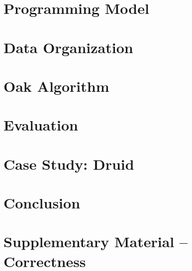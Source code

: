\documentclass[sigplan,10pt,review,anonymous]{acmart}
\theoremstyle{definition}
\begin{document}
    \section{Programming Model}
    
		
   \section{Data Organization}
   \label{sec:arch}
    
		
    \section{Oak Algorithm}
    \label{sec:alg}
    
      
    \section{Evaluation}
    

   \section{Case Study: Druid}
   

    \section{Conclusion}
    
    
    \newpage
    
  
  \appendix
    
    \cleardoublepage
   \section{ Supplementary Material -- Correctness}
    
    
\end{document}
